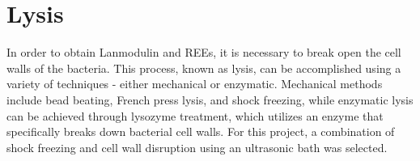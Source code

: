 \section{Lysis\authorB}\label{sec:me_lysis}
In order to obtain Lanmodulin and REEs, it is necessary to break open the cell walls of
the bacteria.
This process, known as lysis, can be accomplished using a variety of
techniques - either mechanical or enzymatic.
Mechanical methods include bead beating, French press lysis, and shock freezing, while enzymatic lysis can be achieved through lysozyme treatment, which utilizes an enzyme that specifically breaks down bacterial cell walls.
For this project, a combination of shock freezing and cell wall disruption using an ultrasonic bath was selected.